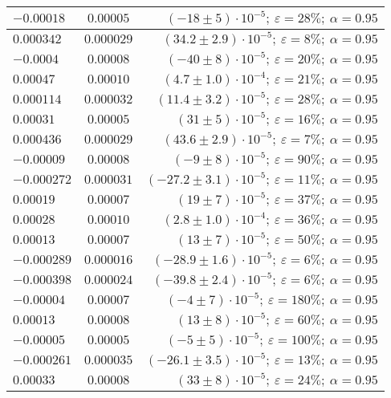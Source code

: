 \documentclass{article}%
\begin{document}
\begin{longtable}{| l | c | r |}
$-0.00018$&$0.00005$&$(-18 \pm 5) \cdot 10 ^{-5};\:\varepsilon = 28\%; \: \alpha = 0.95$\\%
\hline%
$0.000342$&$0.000029$&$(34.2 \pm 2.9) \cdot 10 ^{-5};\:\varepsilon = 8\%; \: \alpha = 0.95$\\%
\hline%
$-0.0004$&$0.00008$&$(-40 \pm 8) \cdot 10 ^{-5};\:\varepsilon = 20\%; \: \alpha = 0.95$\\%
\hline%
$0.00047$&$0.00010$&$(4.7 \pm 1.0) \cdot 10 ^{-4};\:\varepsilon = 21\%; \: \alpha = 0.95$\\%
\hline%
$0.000114$&$0.000032$&$(11.4 \pm 3.2) \cdot 10 ^{-5};\:\varepsilon = 28\%; \: \alpha = 0.95$\\%
\hline%
$0.00031$&$0.00005$&$(31 \pm 5) \cdot 10 ^{-5};\:\varepsilon = 16\%; \: \alpha = 0.95$\\%
\hline%
$0.000436$&$0.000029$&$(43.6 \pm 2.9) \cdot 10 ^{-5};\:\varepsilon = 7\%; \: \alpha = 0.95$\\%
\hline%
$-0.00009$&$0.00008$&$(-9 \pm 8) \cdot 10 ^{-5};\:\varepsilon = 90\%; \: \alpha = 0.95$\\%
\hline%
$-0.000272$&$0.000031$&$(-27.2 \pm 3.1) \cdot 10 ^{-5};\:\varepsilon = 11\%; \: \alpha = 0.95$\\%
\hline%
$0.00019$&$0.00007$&$(19 \pm 7) \cdot 10 ^{-5};\:\varepsilon = 37\%; \: \alpha = 0.95$\\%
\hline%
$0.00028$&$0.00010$&$(2.8 \pm 1.0) \cdot 10 ^{-4};\:\varepsilon = 36\%; \: \alpha = 0.95$\\%
\hline%
$0.00013$&$0.00007$&$(13 \pm 7) \cdot 10 ^{-5};\:\varepsilon = 50\%; \: \alpha = 0.95$\\%
\hline%
$-0.000289$&$0.000016$&$(-28.9 \pm 1.6) \cdot 10 ^{-5};\:\varepsilon = 6\%; \: \alpha = 0.95$\\%
\hline%
$-0.000398$&$0.000024$&$(-39.8 \pm 2.4) \cdot 10 ^{-5};\:\varepsilon = 6\%; \: \alpha = 0.95$\\%
\hline%
$-0.00004$&$0.00007$&$(-4 \pm 7) \cdot 10 ^{-5};\:\varepsilon = 180\%; \: \alpha = 0.95$\\%
\hline%
$0.00013$&$0.00008$&$(13 \pm 8) \cdot 10 ^{-5};\:\varepsilon = 60\%; \: \alpha = 0.95$\\%
\hline%
$-0.00005$&$0.00005$&$(-5 \pm 5) \cdot 10 ^{-5};\:\varepsilon = 100\%; \: \alpha = 0.95$\\%
\hline%
$-0.000261$&$0.000035$&$(-26.1 \pm 3.5) \cdot 10 ^{-5};\:\varepsilon = 13\%; \: \alpha = 0.95$\\%
\hline%
$0.00033$&$0.00008$&$(33 \pm 8) \cdot 10 ^{-5};\:\varepsilon = 24\%; \: \alpha = 0.95$\\%

\end{longtable}
\end{document}
